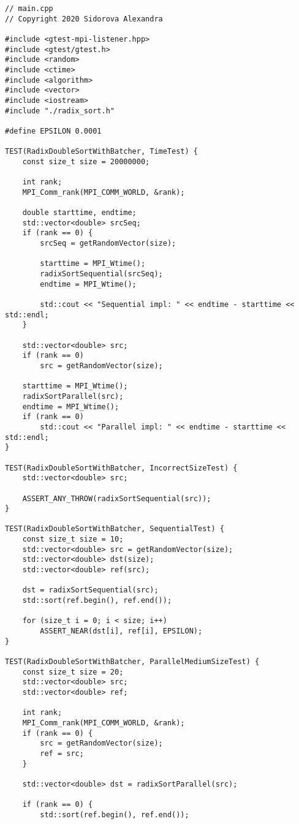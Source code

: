 \documentclass{report}
\begin{document}
\begin{lstlisting}
// main.cpp
// Copyright 2020 Sidorova Alexandra

#include <gtest-mpi-listener.hpp>
#include <gtest/gtest.h>
#include <random>
#include <ctime>
#include <algorithm>
#include <vector>
#include <iostream>
#include "./radix_sort.h"

#define EPSILON 0.0001

TEST(RadixDoubleSortWithBatcher, TimeTest) {
    const size_t size = 20000000;

    int rank;
    MPI_Comm_rank(MPI_COMM_WORLD, &rank);

    double starttime, endtime;
    std::vector<double> srcSeq;
    if (rank == 0) {
        srcSeq = getRandomVector(size);

        starttime = MPI_Wtime();
        radixSortSequential(srcSeq);
        endtime = MPI_Wtime();

        std::cout << "Sequential impl: " << endtime - starttime << std::endl;
    }

    std::vector<double> src;
    if (rank == 0)
        src = getRandomVector(size);

    starttime = MPI_Wtime();
    radixSortParallel(src);
    endtime = MPI_Wtime();
    if (rank == 0)
        std::cout << "Parallel impl: " << endtime - starttime << std::endl;
}

TEST(RadixDoubleSortWithBatcher, IncorrectSizeTest) {
    std::vector<double> src;

    ASSERT_ANY_THROW(radixSortSequential(src));
}

TEST(RadixDoubleSortWithBatcher, SequentialTest) {
    const size_t size = 10;
    std::vector<double> src = getRandomVector(size);
    std::vector<double> dst(size);
    std::vector<double> ref(src);

    dst = radixSortSequential(src);
    std::sort(ref.begin(), ref.end());

    for (size_t i = 0; i < size; i++)
        ASSERT_NEAR(dst[i], ref[i], EPSILON);
}

TEST(RadixDoubleSortWithBatcher, ParallelMediumSizeTest) {
    const size_t size = 20;
    std::vector<double> src;
    std::vector<double> ref;

    int rank;
    MPI_Comm_rank(MPI_COMM_WORLD, &rank);
    if (rank == 0) {
        src = getRandomVector(size);
        ref = src;
    }

    std::vector<double> dst = radixSortParallel(src);

    if (rank == 0) {
        std::sort(ref.begin(), ref.end());


\end{lstlisting}
\end{document}
